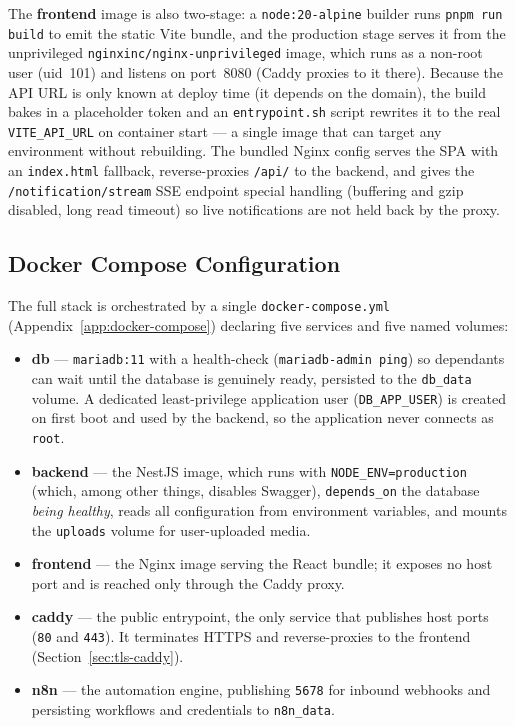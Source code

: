 \documentclass[12pt, a4paper, oneside]{report}
\begin{document}
The \textbf{frontend} image is also two-stage: a
\texttt{node:20-alpine} builder runs \texttt{pnpm run build} to emit
the static Vite bundle, and the production stage serves it from the
unprivileged \texttt{nginxinc/nginx-unprivileged} image, which runs as
a non-root user (uid~101) and listens on port~8080 (Caddy proxies to
it there). Because the API URL is only known at deploy
time (it depends on the domain), the build bakes in a placeholder
token and an \texttt{entrypoint.sh} script rewrites it to the real
\texttt{VITE\_API\_URL} on container start --- a single image that can
target any environment without rebuilding. The bundled Nginx config
serves the SPA with an \texttt{index.html} fallback, reverse-proxies
\texttt{/api/} to the backend, and gives the
\texttt{/notification/stream} SSE endpoint special handling
(buffering and gzip disabled, long read timeout) so live
notifications are not held back by the proxy.

\subsection{Docker Compose Configuration}

The full stack is orchestrated by a single \texttt{docker-compose.yml}
(Appendix~\ref{app:docker-compose}) declaring five services and five
named volumes:

\begin{itemize}[leftmargin=*,itemsep=2pt]
  \item \textbf{db} --- \texttt{mariadb:11} with a health-check
        (\texttt{mariadb-admin ping}) so dependants can wait until the
        database is genuinely ready, persisted to the \texttt{db\_data}
        volume. A dedicated least-privilege application user
        (\texttt{DB\_APP\_USER}) is created on first boot and used by the
        backend, so the application never connects as \texttt{root}.
  \item \textbf{backend} --- the NestJS image, which runs with
        \texttt{NODE\_ENV=production} (which, among other things, disables
        Swagger), \texttt{depends\_on} the database \emph{being healthy}, reads
        all configuration from environment variables, and mounts the
        \texttt{uploads} volume for user-uploaded media.
  \item \textbf{frontend} --- the Nginx image serving the React
        bundle; it exposes no host port and is reached only through
        the Caddy proxy.
  \item \textbf{caddy} --- the public entrypoint, the only service
        that publishes host ports (\texttt{80} and \texttt{443}). It
        terminates HTTPS and reverse-proxies to the frontend
        (Section~\ref{sec:tls-caddy}).
  \item \textbf{n8n} --- the automation engine, publishing
        \texttt{5678} for inbound webhooks and persisting workflows and
        credentials to \texttt{n8n\_data}.
\end{itemize}
\end{document}
